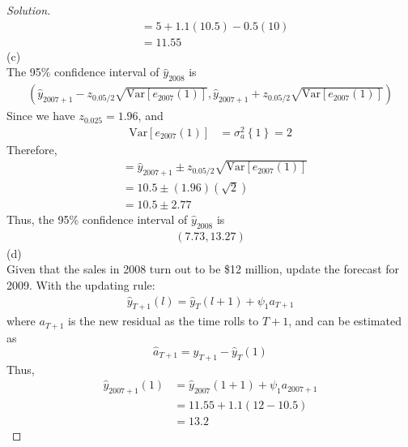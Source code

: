 \documentclass[UTF8,a4paper,14pt]{ctexart}
\newcommand{\Var}{\mathrm{Var}}
\newenvironment{solution}
  {\renewcommand\qedsymbol{$\blacksquare$}\begin{proof}[Solution]}
  {\end{proof}}
\theoremstyle{definition}
\theoremstyle{remark}
\begin{document}
\begin{solution}
\begin{equation}
\begin{aligned}
      &=5+1.1(10.5)-0.5(10)\\
      &=11.55
    \end{aligned}
  \end{equation}
  (c)\\
  The 95\% confidence interval of \(\hat{y}_{2008}\) is
  \begin{equation}
    \begin{aligned}
      \left(\hat{y}_{2007+1}-z_{0.05/2}\sqrt{\Var[e_{2007}(1)]},\hat{y}_{2007+1}+z_{0.05/2}\sqrt{\Var[e_{2007}(1)]}\right)
    \end{aligned}
  \end{equation}
  Since we have \(z_{0.025}=1.96\), and
  \begin{equation}
    \begin{aligned}
      \Var[e_{2007}(1)]&=\sigma_a^2\left\{1\right\}=2
    \end{aligned}
  \end{equation}
  Therefore,
  \begin{equation}
    \begin{aligned}
      &=\hat{y}_{2007+1}\pm z_{0.05/2}\sqrt{\Var[e_{2007}(1)]}\\
      &=10.5\pm (1.96)(\sqrt{2})\\
      &=10.5\pm 2.77
    \end{aligned}
  \end{equation}
  Thus, the 95\% confidence interval of \(\hat{y}_{2008}\) is
  \begin{equation}
    \begin{aligned}
      \left(7.73, 13.27\right)
    \end{aligned}
  \end{equation}
  (d)\\
  Given that the sales in 2008 turn out to be \$12 million, update the forecast for 2009.
  With the updating rule:
  \begin{equation}
    \begin{aligned}
      \hat{y}_{T+1}(l)=\hat{y}_{T}(l+1)+\psi_1 a_{T+1}
    \end{aligned}
  \end{equation}
  where \(a_{T+1}\) is the new residual as the time rolls to \(T+1\), and can be estimated as \[\hat{a}_{T+1} = y_{T+1}-\hat{y}_{T}(1)\]
  Thus,
  \begin{equation}
    \begin{aligned}
      \hat{y}_{2007+1}(1)&=\hat{y}_{2007}(1+1)+\psi_1 a_{2007+1}\\
      &=11.55+1.1(12-10.5)\\
      &=13.2
    \end{aligned}
  \end{equation}


\end{solution}
\end{document}
